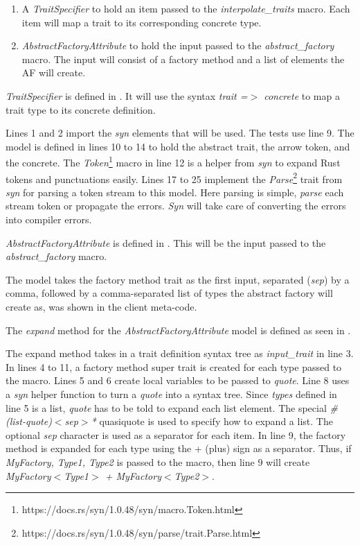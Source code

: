 \begin{enumerate}
	\item A \textit{TraitSpecifier} to hold an item passed to the \textit{interpolate\_traits} macro.
	      Each item will map a trait to its corresponding concrete type.
	\item \textit{AbstractFactoryAttribute} to hold the input passed to the \textit{abstract\_factory} macro.
	      The input will consist of a factory method and a list of elements the AF will create.
\end{enumerate}

\textit{TraitSpecifier} is defined in .
It will use the syntax \textit{trait =$>$ concrete} to map a trait type to its concrete definition.

Lines 1 and 2 import the \textit{syn} elements that will be used.
The tests use line 9.
The model is defined in lines 10 to 14 to hold the abstract trait, the arrow token, and the concrete.
The \textit{Token}\footnote{https://docs.rs/syn/1.0.48/syn/macro.Token.html} macro in line 12 is a helper from \textit{syn} to expand Rust tokens and punctuations easily.
Lines 17 to 25 implement the \textit{Parse}\footnote{https://docs.rs/syn/1.0.48/syn/parse/trait.Parse.html} trait from \textit{syn} for parsing a token stream to this model.
Here parsing is simple, \textit{parse} each stream token or propagate the errors.
\textit{Syn} will take care of converting the errors into compiler errors.

\textit{AbstractFactoryAttribute} is defined in .
This will be the input passed to the \textit{abstract\_factory} macro.

The model takes the factory method trait as the first input, separated (\textit{sep}) by a comma, followed by a comma-separated list of types the abstract factory will create as, was shown in the client meta-code.

The \textit{expand} method for the \textit{AbstractFactoryAttribute} model is defined as seen in .

The expand method takes in a trait definition syntax tree as \textit{input\_trait} in line 3.
In lines 4 to 11, a factory method super trait is created for each type passed to the macro.
Lines 5 and 6 create local variables to be passed to \textit{quote}.
Line 8 uses a \textit{syn} helper function to turn a \textit{quote} into a syntax tree.
Since \textit{types} defined in line 5 is a list, \textit{quote} has to be told to expand each list element.
The special \textit{\#(list-quote)$<$sep$>$*} quasiquote is used to specify how to expand a list.
The optional \textit{sep} character is used as a separator for each item.
In line 9, the factory method is expanded for each type using the + (plus) sign as a separator.
Thus, if \textit{MyFactory, Type1, Type2} is passed to the macro, then line 9 will create \textit{MyFactory$<$Type1$>$ + MyFactory$<$Type2$>$}.

